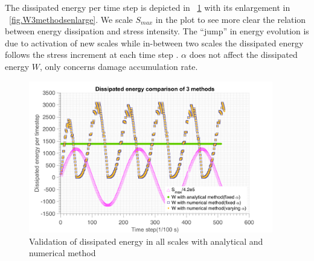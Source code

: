 \documentclass[3p,times,number,review]{elsarticle}
\newcommand{\figref}[1]{\figurename~\ref{#1}}
\begin{document}
The dissipated energy per time step is depicted in \figref{fig.W3methods} with its enlargement in \figref{fig.W3methodsenlarge}. We scale $S_{max}$ in the plot to see more clear the relation between energy dissipation and stress intensity. The ``jump'' in energy evolution is due to activation of new scales while in-between two scales the dissipated energy follows the stress increment at each time step . $\alpha$ does not affect the dissipated energy $W$, only concerns damage accumulation rate.
\begin{figure}[!h]
	\centering
	\includegraphics[width=0.95\textwidth]{figures//W_3methods.png} 
	\caption{Validation of dissipated energy in all scales with analytical and numerical method }
	\label{fig.W3methods}
\end{figure}
\end{document}

